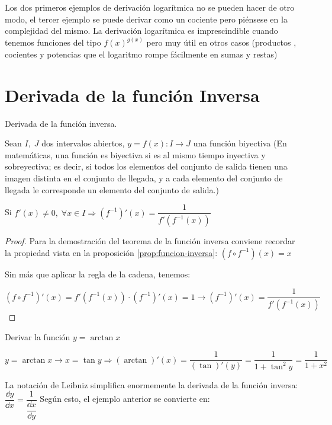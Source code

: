	Los dos primeros ejemplos de derivación logarítmica no se pueden hacer de otro modo, el tercer ejemplo se puede derivar como un cociente pero piénsese en la complejidad del mismo. La derivación logarítmica es imprescindible cuando tenemos funciones del tipo $f(x)^{g(x)}$ pero muy útil en otros casos (productos , cocientes y potencias que el logaritmo rompe fácilmente en sumas y restas)
	
	
	\section{Derivada de la función Inversa}
	
	\begin{teor} Derivada de la función inversa.
	
	
	
	Sean $I, \; J$ dos intervalos abiertos, $y=f(x):I \to J$ una función biyectiva (En matemáticas, una función es biyectiva si es al mismo tiempo inyectiva y sobreyectiva; es decir, si todos los elementos del conjunto de salida tienen una imagen distinta en el conjunto de llegada, y a cada elemento del conjunto de llegada le corresponde un elemento del conjunto de salida.)
		
		Si $f'(x)\neq 0,\; \forall x \in I \Rightarrow (f^{-1})'(x)=\dfrac {1} {f' \left(  f^{-1}(x) \right)} $
	\end{teor}
	
	\begin{proof}Para la demostración del teorema de la función inversa conviene recordar la propiedad vista en la proposición \ref{prop:funcion-inversa}:  $(f\circ f^{-1})(x)=x$
	
	Sin más que aplicar la regla de la cadena, tenemos:
	
	$(f\circ f^{-1})'(x)=f'(f^{-1}(x))\cdot (f^{-1})'(x)=1\to (f^{-1})'(x)= \dfrac {1} {f' \left(  f^{-1}(x) \right)}$
		
	\end{proof}

	
	\begin{ejem} Derivar la función $y=\arctan x$
	
	$y=\arctan x \to x=\tan y \Rightarrow (\arctan)'(x)=\dfrac {1}{(\tan)'(y)}=\dfrac {1}{1+ \tan^2 y}=\dfrac {1}{1+x^2}$
		
	\end{ejem}
	
	La notación de Leibniz simplifica enormemente la derivada de la función inversa:  $\dfrac {\dd y}{\dd x}= \dfrac {1}{\dfrac {\dd x}{\dd y}}$ Según esto, el ejemplo anterior se convierte en:
	
